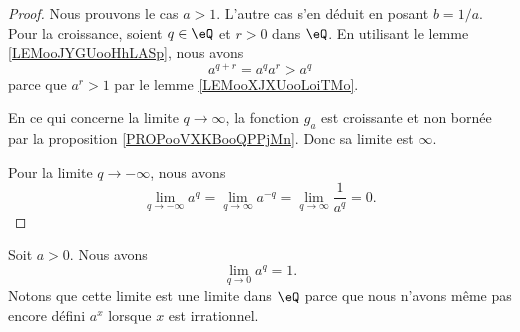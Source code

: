 \begin{proof}
	Nous prouvons le cas \( a>1\). L'autre cas s'en déduit en posant \( b=1/a\). Pour la croissance, soient \( q\in \eQ\) et \( r>0\) dans \( \eQ\). En utilisant le lemme \ref{LEMooJYGUooHhLASp}, nous avons
	\begin{equation}
		a^{q+r}=a^qa^r>a^q
	\end{equation}
	parce que \( a^r>1\) par le lemme \ref{LEMooXJXUooLoiTMo}.

	En ce qui concerne la limite \( q\to \infty\), la fonction \( g_a\) est croissante et non bornée par la proposition \ref{PROPooVXKBooQPPjMn}. Donc sa limite est \( \infty\).

	Pour la limite \( q\to -\infty\), nous avons
	\begin{equation}
		\lim_{q\to -\infty} a^q=\lim_{q\to \infty} a^{-q}=\lim_{q\to \infty} \frac{1}{ a^q }=0.
	\end{equation}
\end{proof}

\begin{proposition}      \label{PROPooIIDGooTRtlUD}
	Soit \( a>0\). Nous avons
	\begin{equation}
		\lim_{q\to 0} a^q=1.
	\end{equation}
	Notons que cette limite est une limite dans \( \eQ\) parce que nous n'avons même pas encore défini \( a^x\) lorsque \( x\) est irrationnel.
\end{proposition}

